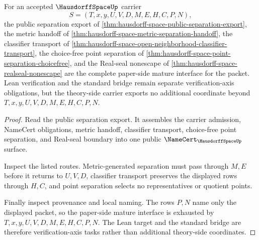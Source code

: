 \begin{theorem}
\label{thm:hausdorff-space-mature-standard-bridge-readiness}
For an accepted $\HausdorffSpaceUp$ carrier
$$
S=(T,x,y,U,V,D,M,E,H,C,P,N),
$$
the public separation export of \autoref{thm:hausdorff-space-public-separation-export}, the metric handoff of \autoref{thm:hausdorff-space-metric-separation-handoff}, the classifier transport of \autoref{thm:hausdorff-space-open-neighborhood-classifier-transport}, the choice-free point separation of \autoref{thm:hausdorff-space-point-separation-choicefree}, and the Real-seal nonescape of \autoref{thm:hausdorff-space-realseal-nonescape} are the complete paper-side mature interface for the packet. Lean verification and the standard bridge remain separate verification-axis obligations, but the theory-side carrier exports no additional coordinate beyond $T,x,y,U,V,D,M,E,H,C,P,N$.
\end{theorem}
\begin{proof}
Read the public separation export. It assembles the carrier admission, NameCert obligations, metric handoff, classifier transport, choice-free point separation, and Real-seal boundary into one public $\NameCert_{\HausdorffSpaceUp}$ surface.

Inspect the listed routes. Metric-generated separation must pass through $M,E$ before it returns to $U,V,D$, classifier transport preserves the displayed rows through $H,C$, and point separation selects no representatives or quotient points.

Finally inspect provenance and local naming. The rows $P,N$ name only the displayed packet, so the paper-side mature interface is exhausted by $T,x,y,U,V,D,M,E,H,C,P,N$. The Lean target and the standard bridge are therefore verification-axis tasks rather than additional theory-side coordinates.
\end{proof}


